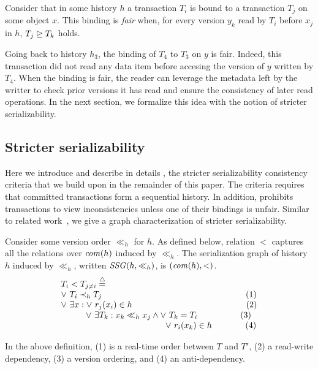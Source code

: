 \begin{definition}
  Consider that in some history $h$ a transaction $T_i$ is bound to a transaction $T_j$ on some object $x$.
  This binding is \emph{fair} when, for every version $y_k$ read by $T_i$ before $x_j$ in $h$, $T_j \mathrel{\unrhd} T_k$ holds.
\end{definition}

Going back to history $h_3$, the binding of $T_4$ to $T_3$ on $y$ is fair.
Indeed, this transaction did not read any data item before accesing the version of $y$ written by $T_4$.
When the binding is fair, the reader can leverage the metadata left by the writter to check prior versions it has read and ensure the consistency of later read operations.
In the next section, we formalize this idea with the notion of stricter serializability.

\subsection{Stricter serializability}
Here we introduce and describe in details \SPSER, the stricter serializability consistency criteria that we build upon in the remainder of this paper.
The \SSER criteria requires that committed transactions form a sequential history.
In addition, \SSER prohibits transactions to view inconsistencies unless one of their bindings is unfair.
Similar to related work~\cite{syn:db:1467}, we give a graph characterization of stricter serializability.

\begin{definition}
  Consider some version order $\ll_h$ for $h$.
  As defined below, relation $<$ captures all the relations over $\committed{h}$ induced by $\ll_h$.
  The serialization graph of history $h$ induced by $\ll_h$, written $\SSG(h,\ll_h)$, is $(\committed{h},<)$.
  \begin{displaymath}
    \begin{array}{l}
      T_i < T_{j \neq i}  \equaldef \\
      \lor~ T_i \hb_h T_j {\hspace{16.8em}\text{(1)}} \\
      \lor~ \exists x : \lor~ r_j(x_i) \in h {\hspace{13.3em}\text{(2)}} \\
      \hspace{2.9em}\lor~ \exists T_k : x_k \ll_h x_j \land \lor~T_k = T_i {\hspace{5em}\text{(3)}} \\
      \hspace{12.2em} \lor~ r_i(x_k) \in h {\hspace{3.9em}\text{(4)}}
    \end{array}
  \end{displaymath}  
\end{definition}
In the above definition, (1) is a real-time order between $T$ and $T'$, (2) a read-write dependency, (3) a version ordering, and (4) an anti-dependency.

